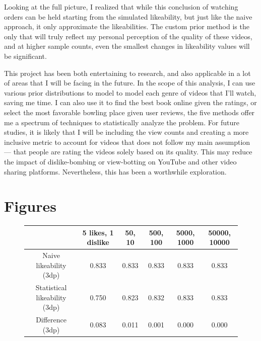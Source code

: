 \documentclass[a4paper,11pt]{article}
\begin{document}
Looking at the full picture, I realized that while this conclusion of watching orders can be held starting from the simulated likeability, but just like the naive approach, it only approximate the likeabilities. The custom prior method is the only that will truly reflect my personal perception of the quality of these videos, and at higher sample counts, even the smallest changes in likeability values will be significant.

This project has been both entertaining to research, and also applicable in a lot of areas that I will be facing in the future. In the scope of this analysis, I can use various prior distributions to model to model each genre of videos that I'll watch, saving me time. I can also use it to find the best book online given the ratings, or select the most favorable bowling place given user reviews, the five methods offer me a spectrum of techniques to statistically analyze the problem. For future studies, it is likely that I will be including the view counts and creating a more inclusive metric to account for videos that does not follow my main assumption --- that people are rating the videos solely based on its quality. This may reduce the  impact of dislike-bombing or view-botting on YouTube and other video sharing platforms. Nevertheless, this has been a worthwhile exploration.

\newpage
\printbibliography


\newpage
\appendix
{}
\section{Figures}

\begin{figure}[H]
    \centering
    \begin{tabular}{c|c|c|c|c|c}
        & 5 likes, 1 dislike & 50, 10 & 500, 100 & 5000, 1000 & 50000, 10000 \\
        \hline
        \hline
        Naive likeability (3dp) & 0.833 & 0.833 & 0.833 & 0.833 & 0.833\\ \hline
        Statistical likeability (3dp) & 0.750 & 0.823 & 0.832 & 0.833 & 0.833\\ \hline
        Difference (3dp) & 0.083 & 0.011 & 0.001 & 0.000 & 0.000
    \end{tabular}
    \label{apd:acc}
\end{figure}
\end{document}
